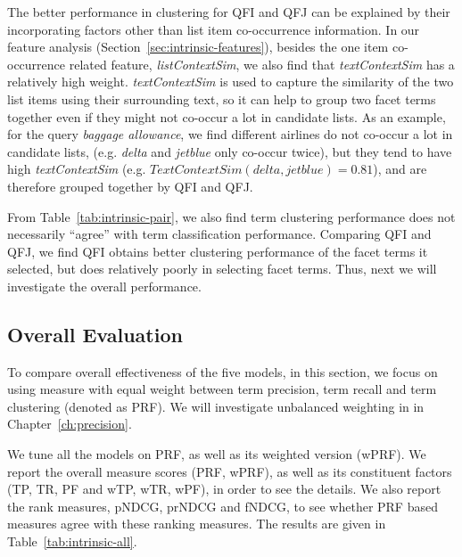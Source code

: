 The better performance in clustering for QFI and QFJ can be explained by their incorporating factors other than list item co-occurrence information. In our feature analysis (Section~\ref{sec:intrinsic-features}), besides the one item co-occurrence related feature, \textit{listContextSim}, we also find that \textit{textContextSim} has a relatively high weight. \textit{textContextSim} is used to capture the similarity of the two list items using their surrounding text, so it can help to group two facet terms together even if they might not co-occur a lot in candidate lists. As an example, for the query \textit{baggage allowance}, we find different airlines do not co-occur a lot in candidate lists, (e.g. \textit{delta} and \textit{jetblue} only co-occur twice), but they tend to have high \textit{textContextSim} (e.g. $TextContextSim(delta,jetblue)=0.81$), and are therefore grouped together by QFI and QFJ.

From Table~\ref{tab:intrinsic-pair}, we also find term clustering performance does not necessarily ``agree'' with term classification performance. Comparing QFI and QFJ, we find QFI obtains better clustering performance of the facet terms it selected, but does relatively poorly in selecting facet terms. Thus, next we will investigate the overall performance.


\subsection{Overall Evaluation}
To compare overall effectiveness of the five models, in this section, we focus on using \PRF measure with equal weight between term precision, term recall and term clustering (denoted as PRF). We will investigate unbalanced weighting in \PRF in Chapter~\ref{ch:precision}.


We tune all the models on PRF, as well as its weighted version (wPRF). We report the overall measure scores (PRF, wPRF), as well as its constituent factors (TP, TR, PF and wTP, wTR, wPF), in order to see the details. We also report the rank measures, pNDCG, prNDCG and fNDCG, to see whether PRF based measures agree with these ranking measures. The results are given in Table~\ref{tab:intrinsic-all}.

